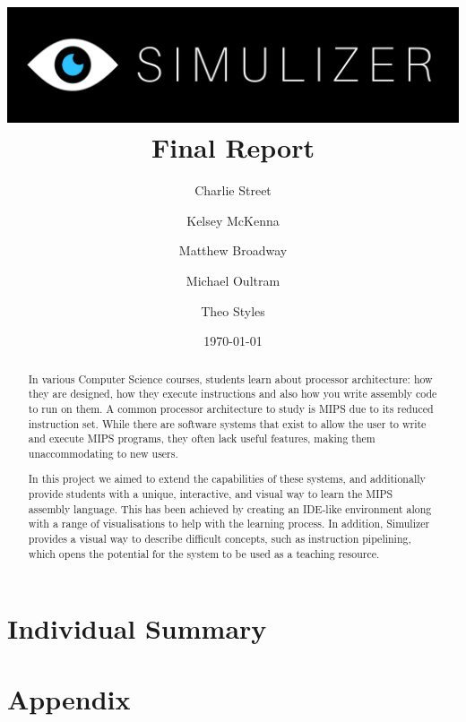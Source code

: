 \documentclass[12pt, a4paper]{article}
\title{
  \includegraphics[width=\textwidth]{segments/SimulizerLogo.png}
  \huge\textbf{Final Report}
}
\author{
  Charlie Street
  \and
  Kelsey McKenna
  \and
  Matthew Broadway
  \and
  Michael Oultram
  \and
  Theo Styles
}
\date{\today}
\begin{document}
\maketitle

\begin{abstract}
  In various Computer Science courses, students learn about processor architecture: how they are designed, how they execute instructions and also how you write assembly code to run on them. A common processor architecture to study is MIPS due to its reduced instruction set. While there are software systems that exist to allow the user to write and execute MIPS programs, they often lack useful features, making them unaccommodating to new users.

  In this project we aimed to extend the capabilities of these systems, and additionally provide students with a unique, interactive, and visual way to learn the MIPS assembly language. This has been achieved by creating an IDE-like environment along with a range of visualisations to help with the learning process. In addition, Simulizer provides a visual way to describe difficult concepts, such as instruction pipelining, which opens the potential for the system to be used as a teaching resource.
\end{abstract}

\clearpage
\tableofcontents
\clearpage











\newpage

\newpage

\section{Individual Summary}

\newpage

\newpage

\newpage

\newpage

\newpage

\section{Appendix}





\end{document}

